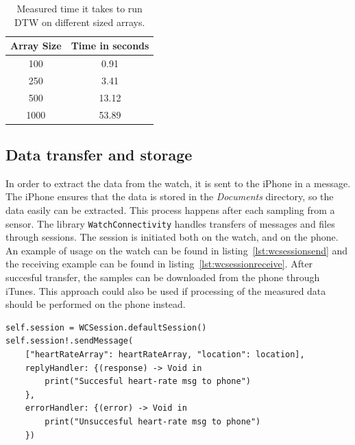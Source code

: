 \begin{table}[!h]
\caption{Measured time it takes to run DTW on different sized arrays.}
\label{tbl:dtw}
\centering
\begin{tabular}{ |c|c|  }
\hline
Array Size  & Time in seconds\\
\hline
100    & 0.91   \\
250    & 3.41   \\
500    & 13.12  \\
1000   & 53.89  \\
\hline
\end{tabular}
\end{table}

\subsection{Data transfer and storage}
In order to extract the data from the watch, it is sent to the iPhone in a
message. The iPhone ensures that the data is stored in the \textit{Documents}
directory, so the data easily can be extracted. This process happens after each
sampling from a sensor. The library \texttt{WatchConnectivity} handles transfers
of messages and files through sessions. The session is initiated both on the
watch, and on the phone. An example of usage on the watch can be found in 
listing~\ref{lst:wcsessionsend} and the receiving example can be found in 
listing~\ref{lst:wcsessionreceive}.
After succesful transfer, the samples can be downloaded from the phone through
iTunes.
This approach could also be used if processing of the measured data should be
performed on the phone instead.

\begin{lstlisting}[label={lst:wcsessionsend},caption={Send heart rate data to the
phone from the watch.},basicstyle=\small]
self.session = WCSession.defaultSession()
self.session!.sendMessage(
    ["heartRateArray": heartRateArray, "location": location],
    replyHandler: {(response) -> Void in
        print("Succesful heart-rate msg to phone")
    },
    errorHandler: {(error) -> Void in
        print("Unsuccesful heart-rate msg to phone")
    })
\end{lstlisting}

